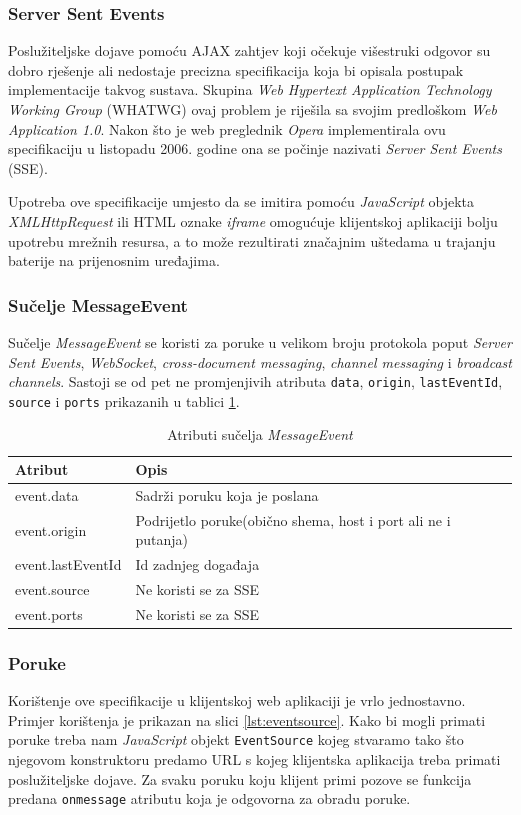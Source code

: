\documentclass[times, utf8, zavrsni]{fer}
\begin{document}
\subsubsection{Server Sent Events}

Poslužiteljske dojave pomoću AJAX zahtjev koji očekuje višestruki odgovor su dobro rješenje ali nedostaje precizna specifikacija koja bi opisala postupak implementacije takvog sustava. Skupina {\em Web Hypertext Application Technology Working Group} (WHATWG) ovaj problem je riješila sa svojim predloškom {\em Web Application 1.0}. Nakon što je web preglednik {\em Opera} implementirala ovu specifikaciju u listopadu 2006. godine ona se počinje nazivati {\em Server Sent Events} (SSE).

Upotreba ove specifikacije umjesto da se imitira pomoću {\em JavaScript} objekta {\em XMLHttpRequest} ili HTML oznake {\em iframe} omogućuje klijentskoj aplikaciji bolju upotrebu mrežnih resursa, a to može rezultirati značajnim uštedama u trajanju baterije na prijenosnim uređajima.

\subsubsection{Sučelje MessageEvent}
Sučelje {\em MessageEvent} se koristi za poruke u velikom broju protokola poput {\em Server Sent Events}, {\em WebSocket}, {\em cross-document messaging}, {\em channel messaging} i {\em broadcast channels}. Sastoji se od pet ne promjenjivih atributa {\tt data}, {\tt origin}, {\tt lastEventId}, {\tt source} i {\tt ports} prikazanih u tablici \ref{tbl:messageevent}.

\begin{table}[htb]
\caption{Atributi sučelja {\em MessageEvent}}
\label{tbl:messageevent}
\centering
\begin{tabular}{lll} \hline
Atribut & Opis \\ \hline
event.data & Sadrži poruku koja je poslana\\
event.origin & Podrijetlo poruke(obično shema, host i port ali ne i putanja)\\
event.lastEventId & Id zadnjeg događaja\\
event.source & Ne koristi se za SSE\\
event.ports & Ne koristi se za SSE\\
\end{tabular}
\end{table}

\subsubsection{Poruke}
Korištenje ove specifikacije u klijentskoj web aplikaciji je vrlo jednostavno. Primjer korištenja je prikazan na slici \ref{lst:eventsource}. Kako bi mogli primati poruke treba nam {\em JavaScript} objekt {\tt EventSource} kojeg stvaramo tako što njegovom konstruktoru predamo URL s kojeg klijentska aplikacija treba primati poslužiteljske dojave. Za svaku poruku koju klijent primi pozove se funkcija predana {\tt onmessage} atributu koja je odgovorna za obradu poruke.
\end{document}
